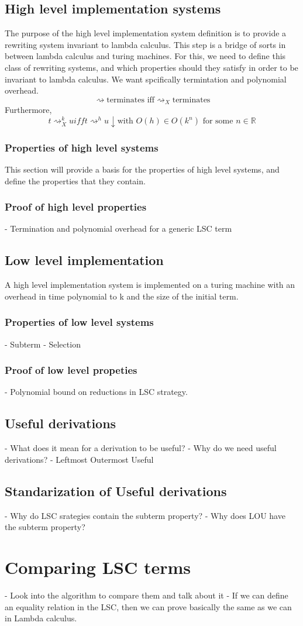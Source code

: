 \documentclass[12pt]{article}
\begin{document}
\subsection{High level implementation systems}
The purpose of the high level implementation system definition is to provide a rewriting system invariant to lambda calculus. This step is a bridge of sorts in between lambda calculus and turing machines. For this, we need to define this class of rewriting systems, and which properties should they satisfy in order to be invariant to lambda calculus. We want spcifically termintation and polynomial overhead.
$$\rightsquigarrow \text{terminates iff} {\rightsquigarrow}_{X} \text{terminates}$$
Furthermore,
$$t {\rightsquigarrow}_{X}^k u iff t {\rightsquigarrow}^h u\downarrow \text{with } O(h) \in O(k^n) \text{ for some } n \in \mathbb{R} $$
\subsubsection{Properties of high level systems}
This section will provide a basis for the properties of high level systems, and define the properties that they contain.
\subsubsection{Proof of high level properties}
- Termination and polynomial overhead for a generic LSC term
\subsection{Low level implementation}
A high level implementation system is implemented on a turing machine with an overhead in time polynomial to k and the size of the initial term.
\subsubsection{Properties of low level systems}
- Subterm
- Selection
\subsubsection{Proof of low level propeties}
- Polynomial bound on reductions in LSC strategy.
\subsection{Useful derivations}
- What does it mean for a derivation to be useful?
- Why do we need useful derivations?
- Leftmost Outermost Useful
\subsection{Standarization of Useful derivations}
- Why do LSC srategies contain the subterm property?
- Why does LOU have the subterm property?
\section{Comparing LSC terms}
- Look into the algorithm to compare them and talk about it
- If we can define an equality relation in the LSC, then we can prove basically the same as we can in Lambda calculus.

\printbibliography
\end{document}
